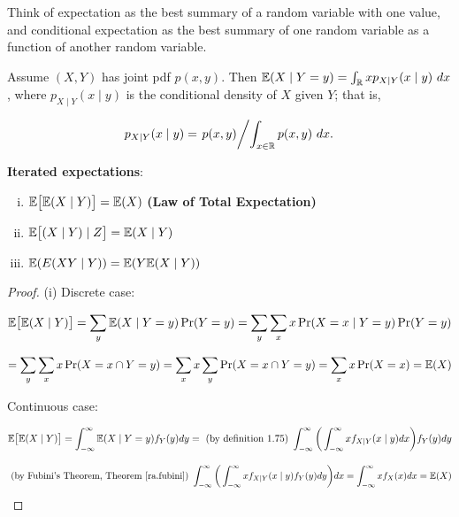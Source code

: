 \begin{remark} Think of expectation as the best summary of a random variable with one value, and conditional expectation as the best summary of one random variable as a function of another random variable.

\end{remark}

\begin{remark}

\end{remark}

\begin{example} Assume \((X, Y)\) has joint pdf \(p(x,y).\) Then \(\mathbb{E}(X \mid Y = y) = \int_{\mathbb{R}} x p_{X \mid Y} (x \mid y) \ dx\), where \(p_{X \mid Y} (x \mid y)\) is the conditional density of \(X\) given \(Y\); that is,

\[
p_{X \mid Y} (x \mid y) = \left. p(x,y) \middle/ \int_{x \in \mathbb{R}} p(x,y) \ dx. \right.
\]

\end{example}

\begin{theorem}\textbf{Iterated expectations}: 

\begin{enumerate}[(i)]

\item \(\mathbb{E}\big[ \mathbb{E}(X \mid Y) \big] = \mathbb{E}(X)\) \textbf{(Law of Total Expectation)}

\item \(\mathbb{E} \big[ (X \mid Y) \mid Z \big] = \mathbb{E}(X \mid Y)\)

\item \( \mathbb{E}(E(XY \mid Y)) = \mathbb{E}(Y \mathbb{E}(X \mid Y))\)

\end{enumerate}
\end{theorem}

\begin{proof}(i) Discrete case:

\[
\mathbb{E}\big[ \mathbb{E}(X \mid Y) \big] = \sum_{y} \mathbb{E}(X \mid Y = y) \Pr(Y=y) =  \sum_{y} \sum_{x} x \Pr(X=x \mid Y=y) \Pr(Y=y) 
\]

\[
=  \sum_{y} \sum_{x} x \Pr(X=x \cap Y=y) =  \sum_{x}x \sum_{y}  \Pr(X=x \cap Y=y) = \sum_x x \Pr(X=x) = \mathbb{E}(X)
\]

Continuous case:

\[
\mathbb{E}\big[ \mathbb{E}(X \mid Y) \big]  = \int_{-\infty}^\infty \mathbb{E}(X \mid Y = y) f_Y(y) dy = \text{ (by definition 1.75) }  \int_{-\infty}^\infty \bigg( \int_{-\infty}^\infty x f_{X\mid Y}(x \mid y) dx \bigg)  f_Y(y) dy
\]

\[
\text{ (by Fubini's Theorem, Theorem \ref{ra.fubini}) }  \int_{-\infty}^\infty \bigg( \int_{-\infty}^\infty x f_{X\mid Y}(x \mid y)  f_Y(y) dy \bigg)  dx = \int_{-\infty}^\infty x f_X(x) dx = \mathbb{E}(X)
\]

\end{proof}

